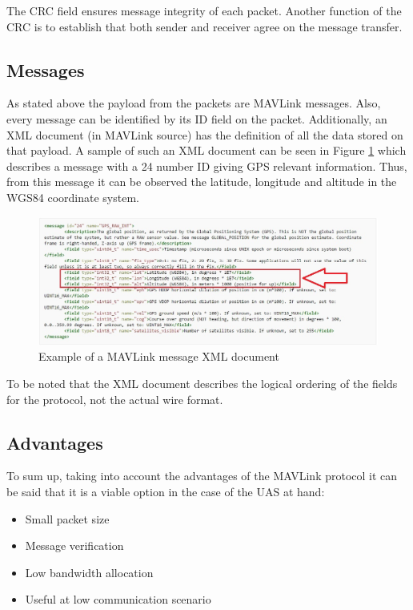 The CRC field ensures message integrity of each packet. Another function of the CRC is to establish that both sender and receiver agree on the message transfer.

\subsection{Messages}
As stated above the payload from the packets are MAVLink messages. Also, every message can be identified by its ID field on the packet. Additionally, an XML document (in MAVLink source) has the definition of all the data stored on that payload. A sample of such an XML document can be seen in Figure \ref{fig:mav_msg} which describes a message with a 24 number ID giving GPS relevant information. Thus, from this message it can be observed the latitude, longitude and altitude in the WGS84 coordinate system.

\begin{figure}[H]
	\centering
	\includegraphics[scale=0.5]{figures/mavlink_msg.jpg}
	\caption{Example of a MAVLink message XML document}
	\label{fig:mav_msg}
\end{figure}

To be noted that the XML document describes the logical ordering of the fields for the protocol, not the actual wire format.

\subsection{Advantages}
To sum up, taking into account the advantages of the MAVLink protocol it can be said that it is a viable option in the case of the UAS at hand:
\begin{itemize}
	\item Small packet size
	\item Message verification
	\item Low bandwidth allocation
	\item Useful at low communication scenario
\end{itemize}
